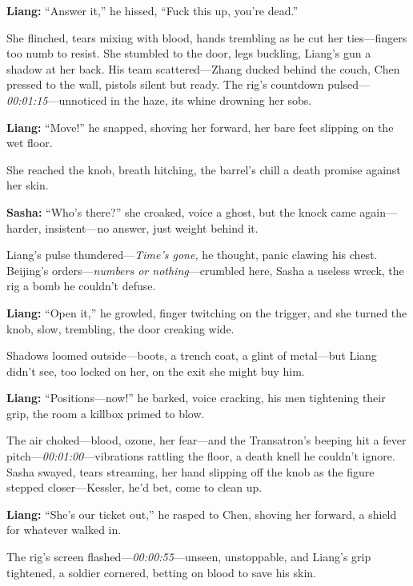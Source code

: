 \documentclass[12pt]{book}
\begin{document}
\vspace{0.5em}
\textbf{Liang:} “Answer it,” he hissed, “Fuck this up, you’re dead.”

She flinched, tears mixing with blood, hands trembling as he cut her ties—fingers too numb to resist. She stumbled to the door, legs buckling, Liang’s gun a shadow at her back. His team scattered—Zhang ducked behind the couch, Chen pressed to the wall, pistols silent but ready. The rig’s countdown pulsed—\emph{00:01:15}—unnoticed in the haze, its whine drowning her sobs. 

\vspace{0.5em}
\textbf{Liang:} “Move!” he snapped, shoving her forward, her bare feet slipping on the wet floor.

She reached the knob, breath hitching, the barrel’s chill a death promise against her skin. 

\vspace{0.5em}
\textbf{Sasha:} “Who’s there?” she croaked, voice a ghost, but the knock came again—harder, insistent—no answer, just weight behind it.

Liang’s pulse thundered—\emph{Time’s gone,} he thought, panic clawing his chest. Beijing’s orders—\emph{numbers or nothing}—crumbled here, Sasha a useless wreck, the rig a bomb he couldn’t defuse. 

\vspace{0.5em}
\textbf{Liang:} “Open it,” he growled, finger twitching on the trigger, and she turned the knob, slow, trembling, the door creaking wide.

Shadows loomed outside—boots, a trench coat, a glint of metal—but Liang didn’t see, too locked on her, on the exit she might buy him. 

\vspace{0.5em}
\textbf{Liang:} “Positions—now!” he barked, voice cracking, his men tightening their grip, the room a killbox primed to blow.

The air choked—blood, ozone, her fear—and the Transatron’s beeping hit a fever pitch—\emph{00:01:00}—vibrations rattling the floor, a death knell he couldn’t ignore. Sasha swayed, tears streaming, her hand slipping off the knob as the figure stepped closer—Kessler, he’d bet, come to clean up. 

\vspace{0.5em}
\textbf{Liang:} “She’s our ticket out,” he rasped to Chen, shoving her forward, a shield for whatever walked in.

The rig’s screen flashed—\emph{00:00:55}—unseen, unstoppable, and Liang’s grip tightened, a soldier cornered, betting on blood to save his skin.
\end{document}
